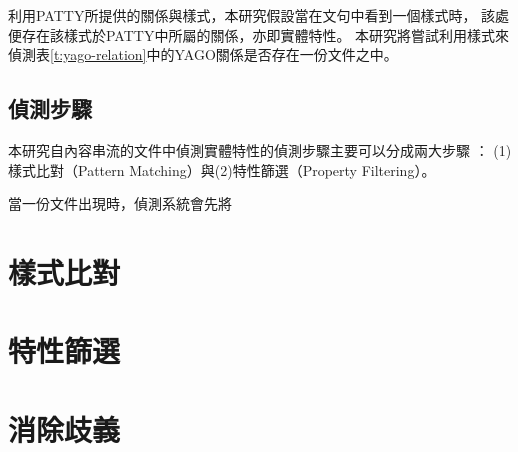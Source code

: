 利用PATTY所提供的關係與樣式，本研究假設當在文句中看到一個樣式時，
該處便存在該樣式於PATTY中所屬的關係，亦即實體特性。
本研究將嘗試利用樣式來偵測表\ref{t:yago-relation}中的YAGO關係是否存在一份文件之中。



\subsection{偵測步驟}

本研究自內容串流的文件中偵測實體特性的偵測步驟主要可以分成兩大步驟 ：
(1)樣式比對（Pattern Matching）與(2)特性篩選（Property Filtering）。

當一份文件出現時，偵測系統會先將

\section{樣式比對}

\section{特性篩選}

\section{}
\section{消除歧義}


